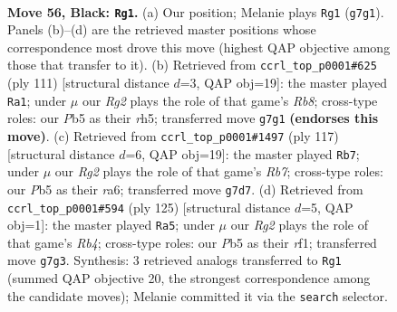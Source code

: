 \documentclass[11pt]{article}
\begin{document}
\clearpage

\begin{figure}[p]\centering
\begin{subfigure}{0.46\textwidth}\centering
\resizebox{\linewidth}{!}{%
\newchessgame
\chessboard[
  setfen={8/6r1/5K2/1p5k/8/8/8/8 b - - 7 56},
  showmover=false,
  pgfstyle=straightmove, color=movearrow, markmove={g7-g1}
]}
\caption{}
\end{subfigure}\hfill
\begin{subfigure}{0.46\textwidth}\centering
\resizebox{\linewidth}{!}{%
\newchessgame
\chessboard[
  setfen={2k5/8/8/7R/8/8/2K5/1r6 b - - 13 56},
  showmover=false,
  pgfstyle=straightmove, color=movearrow, markmove={b1-a1}
]}
\caption{}
\end{subfigure}
\\[4pt]
\begin{subfigure}{0.46\textwidth}\centering
\resizebox{\linewidth}{!}{%
\newchessgame
\chessboard[
  setfen={8/8/R6p/8/6k1/2K5/1r6/8 b - - 1 59},
  showmover=false,
  pgfstyle=straightmove, color=movearrow, markmove={b2-b7}
]}
\caption{}
\end{subfigure}\hfill
\begin{subfigure}{0.46\textwidth}\centering
\resizebox{\linewidth}{!}{%
\newchessgame
\chessboard[
  setfen={2k5/8/3K4/1r6/8/8/8/5R2 b - - 7 63},
  showmover=false,
  pgfstyle=straightmove, color=movearrow, markmove={b5-a5}
]}
\caption{}
\end{subfigure}
\caption{\textbf{Move 56, Black: \texttt{Rg1}.} (a) Our position; Melanie plays \texttt{Rg1} (\texttt{g7g1}). Panels (b)--(d) are the retrieved master positions whose correspondence most drove this move (highest QAP objective among those that transfer to it). (b) Retrieved from \texttt{ccrl\_top\_p0001\#625} (ply 111) [structural distance $d$=3, QAP obj=19]: the master played \texttt{Ra1}; under $\mu$ our \emph{Rg2} plays the role of that game's \emph{Rb8}; cross-type roles: our \emph{P}b5 as their \emph{r}h5; transferred move \texttt{g7g1} \textbf{(endorses this move)}. (c) Retrieved from \texttt{ccrl\_top\_p0001\#1497} (ply 117) [structural distance $d$=6, QAP obj=19]: the master played \texttt{Rb7}; under $\mu$ our \emph{Rg2} plays the role of that game's \emph{Rb7}; cross-type roles: our \emph{P}b5 as their \emph{r}a6; transferred move \texttt{g7d7}. (d) Retrieved from \texttt{ccrl\_top\_p0001\#594} (ply 125) [structural distance $d$=5, QAP obj=1]: the master played \texttt{Ra5}; under $\mu$ our \emph{Rg2} plays the role of that game's \emph{Rb4}; cross-type roles: our \emph{P}b5 as their \emph{r}f1; transferred move \texttt{g7g3}. Synthesis: 3 retrieved analogs transferred to \texttt{Rg1} (summed QAP objective 20, the strongest correspondence among the candidate moves); Melanie committed it via the \texttt{search} selector.}
\label{fig:thought-m111}
\end{figure}
\end{document}
